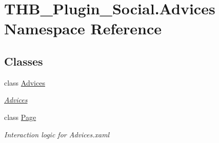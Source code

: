 \hypertarget{namespace_t_h_b___plugin___social_1_1_advices}{}\section{T\+H\+B\+\_\+\+Plugin\+\_\+\+Social.\+Advices Namespace Reference}
\label{namespace_t_h_b___plugin___social_1_1_advices}
\subsection*{Classes}
\begin{DoxyCompactItemize}
\item 
class \mbox{\hyperlink{class_t_h_b___plugin___social_1_1_advices_1_1_advices}{Advices}}
\begin{DoxyCompactList}\small\item\em \mbox{\hyperlink{class_t_h_b___plugin___social_1_1_advices_1_1_advices}{Advices}} \end{DoxyCompactList}\item 
class \mbox{\hyperlink{class_t_h_b___plugin___social_1_1_advices_1_1_page}{Page}}
\begin{DoxyCompactList}\small\item\em Interaction logic for Advices.\+xaml \end{DoxyCompactList}\end{DoxyCompactItemize}
